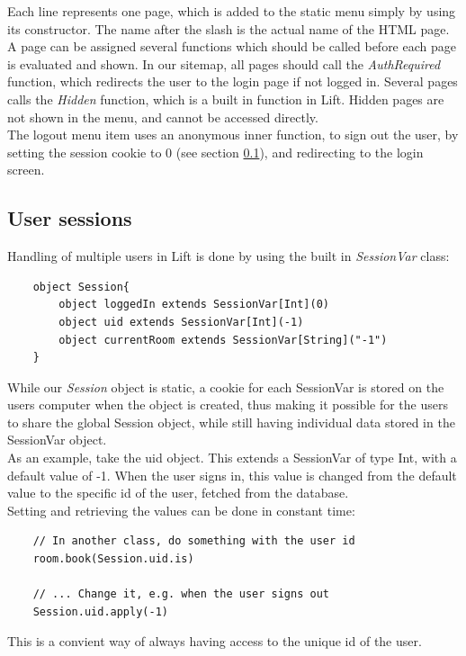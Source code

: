 Each line represents one page, which is added to the static menu simply by using its constructor. The name after the slash is the actual name of the HTML page. A page can be assigned several functions which should be called before each page is evaluated and shown. In our sitemap, all pages should call the \emph{AuthRequired} function, which redirects the user to the login page if not logged in. Several pages calls the \emph{Hidden} function, which is a built in function in Lift. Hidden pages are not shown in the menu, and cannot be accessed directly. \\
The logout menu item uses an anonymous inner function, to sign out the user, by setting the session cookie to 0 (see section \ref{sub:sessions}), and redirecting to the login screen.\\

\subsection{User sessions}
\label{sub:sessions}
Handling of multiple users in Lift is done by using the built in \emph{SessionVar} class:

\begin{verbatim}
    object Session{
        object loggedIn extends SessionVar[Int](0)
        object uid extends SessionVar[Int](-1)
        object currentRoom extends SessionVar[String]("-1")
    }
\end{verbatim}

While our \emph{Session} object is static, a cookie for each SessionVar is stored on the users computer when the object is created, thus making it possible for the users to share the global Session object, while still having individual data stored in the SessionVar object. \\
As an example, take the uid object. This extends a SessionVar of type Int, with a default value of -1. When the user signs in, this value is changed from the default value to the specific id of the user, fetched from the database.\\

Setting and retrieving the values can be done in constant time:
\begin{verbatim}
	// In another class, do something with the user id
	room.book(Session.uid.is)
	
	// ... Change it, e.g. when the user signs out
	Session.uid.apply(-1)
\end{verbatim}
This is a convient way of always having access to the unique id of the user.

